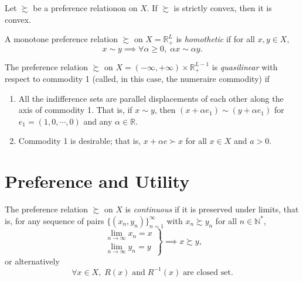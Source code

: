 \documentclass[11pt,fleqn]{book} %
\begin{document}
\begin{proposition}
	Let $\succsim$ be a preference relationon on $X$. If $\succsim$ is strictly convex, then it is convex.	
\end{proposition}

\begin{definition}
    A monotone preference relation $\succsim$ on $X=\mathbb{R}_+^L$ is \emph{homothetic} if for all $x,y\in X$,
    \[
    x\sim y \implies \forall \alpha\geqslant 0,\;\alpha x\sim\alpha y.
    \]
\end{definition}

\begin{definition}
	The preference relation $\succsim$ on $X=(-\infty,+\infty)\times\mathbb{R}_+^{L-1}$ is \emph{quasilinear}
	with respect to commodity 1 (called, in this case, the numeraire commodity) if
	\begin{enumerate}
		\item All the indifference sets are parallel displacements of each other along the	axis of commodity 1. That is, if $x \sim y$, then $(x + \alpha e_1) \sim (y + \alpha e_1)$ for $e_1=(1,0,\cdots,0)$ and any $\alpha\in\mathbb{R}$.
		\item Commodity 1 is desirable; that is, $x +\alpha e\succ x$ for all $x\in X$ and $a > 0$.
	\end{enumerate}
\end{definition}


\section{Preference and Utility}

\begin{definition}[Continuity]
    The preference relation $\succsim$ on $X$ is \emph{continuous} if it is preserved under limits, that is, for any sequence of pairs $\{(x_n, y_n)\}_{n=1}^\infty$ with $x_n\succsim y_n$ for all $n\in\mathbb{N^*}$,
    \begin{equation*}
    \left.
    \begin{aligned}
    	\lim_{n\to\infty} x_n=x\\
    	\lim_{n\to\infty} y_n=y
    \end{aligned}
    \right\}
    \implies x\succsim y,
    \end{equation*}
    or alternatively
    \[
    \forall x\in X,\; R(x)\;\text{and}\;R^{-1}(x)\;\text{are closed set}.
    \]
    
\end{definition}
\end{document}
